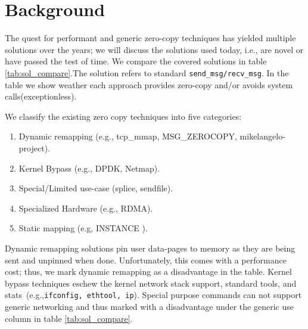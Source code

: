 
\section{Background}\label{sec:background}
The quest for performant and generic zero-copy techniques has yielded multiple solutions over the years; we will discuss the solutions used today, i.e., are novel or have passed the test of time.
We compare the covered solutions in table \ref{tab:sol_compare}.The  solution refers to standard \texttt{send\_msg/recv\_msg}. In the table we show weather each approach provides zero-copy and/or avoids system calls(exceptionless).

We classify the existing zero copy techniques into five categories:
\begin{enumerate}
    \item Dynamic remapping (e.g., tcp\_mmap, MSG\_ZEROCOPY\cite{desendmsg}, mikelangelo-project\cite{mikelangelo}).
    \item Kernel Bypass (e.g., DPDK, Netmap\cite{rizzo2012netmap}).
    \item Special/Limited use-case (splice, sendfile).
    \item Specialized Hardware (e.g., RDMA).
    \item Static mapping (e.g, INSTANCE \cite{instance}).
\end{enumerate}
Dynamic remapping solutions pin user data-pages to memory as they are being sent and unpinned when done. Unfortunately, this comes with a performance cost; thus, we mark dynamic remapping as a disadvantage in the table. Kernel bypass techniques eschew the kernel network stack support, standard tools, and stats~(e.g.,\texttt{ifconfig, ethtool, ip}). Special purpose commands can not support generic networking and thus marked with a disadvantage under the generic use column in table \ref{tab:sol_compare}.




